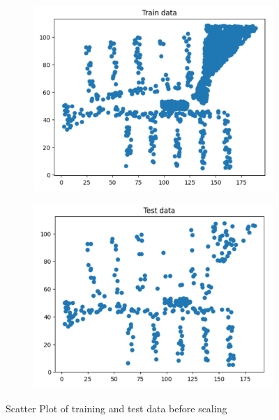 \begin{figure}[H]
    \centering
    \begin{subfigure}[b]{0.45\textwidth}
        \centering
        \includegraphics[width=\textwidth]{images/3-scatterTrain.png}
    \end{subfigure}
    \begin{subfigure}[b]{0.45\textwidth}
        \centering
        \includegraphics[width=\textwidth]{images/3-scatterTest.png}
    \end{subfigure}
    \caption{Scatter Plot of training and test data before scaling}
    \label{fig:scatter1}
\end{figure}

